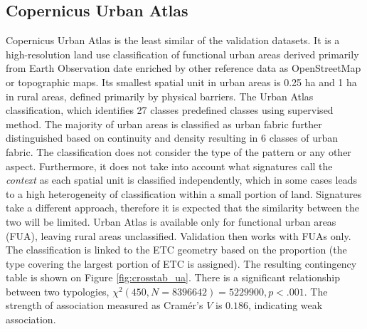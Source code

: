 \subsection*{Copernicus Urban Atlas}
Copernicus Urban Atlas is the least similar of the validation datasets. It is a
high-resolution land use classification of functional urban areas derived primarily from
Earth Observation date enriched by other reference data as OpenStreetMap or topographic
maps. Its smallest spatial unit in urban areas is 0.25 ha and 1 ha in rural areas,
defined primarily by physical barriers. The Urban Atlas classification, which identifies
27 classes predefined classes using supervised method.
The majority of urban areas is classified as urban fabric further distinguished based on
continuity and density resulting in 6 classes of urban fabric. The classification does
not consider the type of the pattern or any other aspect. Furthermore, it does not take
into account what signatures call the \textit{context} as each spatial unit is
classified independently, which in some cases leads to a high heterogeneity of
classification within a small portion of land. Signatures take a different approach,
therefore it is expected that the similarity between the two will be limited.
Urban Atlas is available only for functional urban areas (FUA), leaving rural areas
unclassified. Validation then works with FUAs only. The classification is linked to the
ETC geometry based on the proportion (the type covering the largest portion of ETC is
assigned). The resulting contingency table is shown on Figure \ref{fig:crosstab_ua}. There is a
significant relationship between two typologies, $\chi^{2} (450, N = 8396642) = 5229900,
p < .001$. The strength of association measured as Cramér's $V$ is $0.186$, indicating
weak association.

